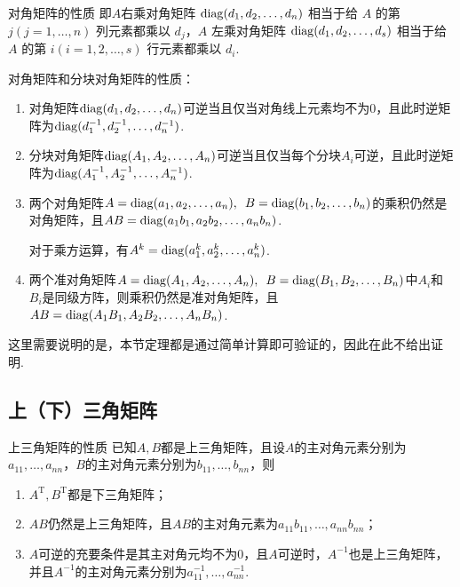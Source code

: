 \begin{theorem}{}{对角矩阵的性质}
    即$A$右乘对角矩阵 $\operatorname{diag}(d_1,d_2,\ldots,d_n)$ 相当于给 $A$ 的第 $j(j = 1, \ldots, n)$ 列元素都乘以 $d_j$，$A$ 左乘对角矩阵 $\operatorname{diag}(d_1,d_2,\ldots,d_s)$ 相当于给 $A$ 的第 $i(i = 1, 2, \ldots, s)$ 行元素都乘以 $d_i$.
\end{theorem}

\begin{theorem}{}{}
    对角矩阵和分块对角矩阵的性质：
    \begin{enumerate}
        \item 对角矩阵$\operatorname{diag}(d_1,d_2,\ldots,d_n)$可逆当且仅当对角线上元素均不为0，且此时逆矩阵为$\operatorname{diag}(d_1^{-1},d_2^{-1},\ldots,d_n^{-1})$.

        \item 分块对角矩阵$\operatorname{diag}(A_1,A_2,\ldots,A_n)$可逆当且仅当每个分块$A_i$可逆，且此时逆矩阵为$\operatorname{diag}(A_1^{-1},A_2^{-1},\ldots,A_n^{-1})$.

        \item 两个对角矩阵$A=\operatorname{diag}(a_1,a_2,\ldots,a_n),\enspace B=\operatorname{diag}(b_1,b_2,\ldots,b_n)$的乘积仍然是对角矩阵，且$AB=\operatorname{diag}(a_1b_1,a_2b_2,\ldots,a_nb_n)$.

              对于乘方运算，有$A^k=\operatorname{diag}(a_1^k,a_2^k,\ldots,a_n^k)$.

        \item 两个准对角矩阵$A=\operatorname{diag}(A_1,A_2,\ldots,A_n),\enspace B=\operatorname{diag}(B_1,B_2,\ldots,B_n)$中$A_i$和$B_i$是同级方阵，则乘积仍然是准对角矩阵，且$AB=\operatorname{diag}(A_1B_1,A_2B_2,\ldots,A_nB_n)$.
    \end{enumerate}
\end{theorem}

这里需要说明的是，本节定理都是通过简单计算即可验证的，因此在此不给出证明.

\subsection{上（下）三角矩阵}

\begin{theorem}{}{上三角矩阵的性质}
    已知$A,B$都是上三角矩阵，且设$A$的主对角元素分别为$a_{11},\ldots,a_{nn}$，$B$的主对角元素分别为$b_{11},\ldots,b_{nn}$，则
    \begin{enumerate}
        \item $A^{\mathrm{T}}, B^\mathrm{T}$都是下三角矩阵；

        \item $AB$仍然是上三角矩阵，且$AB$的主对角元素为$a_{11}b_{11},\ldots,a_{nn}b_{nn}$；

        \item $A$可逆的充要条件是其主对角元均不为0，且$A$可逆时，$A^{-1}$也是上三角矩阵，并且$A^{-1}$的主对角元素分别为$a_{11}^{-1},\ldots,a_{nn}^{-1}$.
    \end{enumerate}
\end{theorem}

